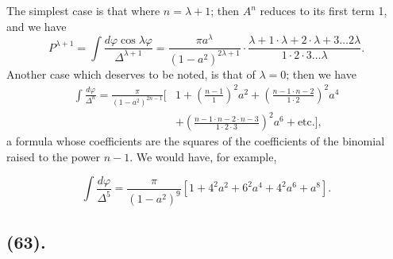 \documentclass{article}
\begin{document}
The simplest case is that where $n=\lambda+1$; then $A^{n}$ reduces to its first term 1, and we have
\[ P^{\lambda+1}=\int\frac{d\varphi\cos\lambda\varphi}{\Delta^{\lambda+1}}=\frac{\pi a^{\lambda}}{(1-a^{2})^{2\lambda+1}}\cdot\frac{\lambda+1\cdot\lambda+2\cdot\lambda+3\ldots2\lambda}{1\cdot2\cdot3\ldots\lambda}. \tag{4} \]
Another case which deserves to be noted, is that of $\lambda=0$; then we have
\[ \begin{aligned} \int\frac{d\varphi}{\Delta^{n}}=\frac{\pi}{(1-a^{2})^{2n-1}}\Big[&1+\left(\frac{n-1}{1}\right)^{2}a^{2}+\left(\frac{n-1\cdot n-2}{1\cdot2}\right)^{2}a^{4}\\ &+\left(\frac{n-1\cdot n-2\cdot n-3}{1\cdot2\cdot3}\right)^{2}a^{6}+\text{etc.}\Big], \end{aligned} \tag{5} \]
a formula whose coefficients are the squares of the coefficients of the binomial raised to the power $n-1$. We would have, for example,

\[ \int\frac{d\varphi}{\Delta^{5}}=\frac{\pi}{(1-a^{2})^{9}}[1+4^{2}a^{2}+6^{2}a^{4}+4^{2}a^{6}+a^{8}]. \]

\subsection*{(63).}
\end{document}
